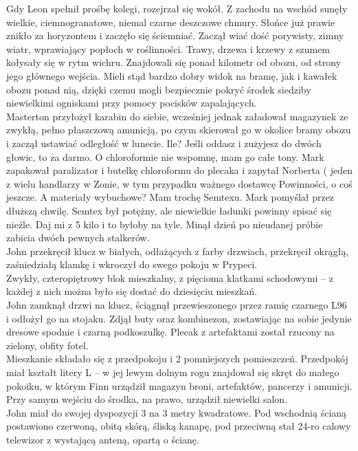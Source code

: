 \documentclass[../MAIN.tex]{subfiles}
\begin{document}
\qd
Gdy Leon spełnił prośbę kolegi, rozejrzał się wokół. Z zachodu na wschód sunęły wielkie, ciemnogranatowe, niemal czarne deszczowe chmury. Słońce już prawie znikło za horyzontem i zaczęło się ściemniać. Zaczął wiać dość porywisty, zimny wiatr, wprawiający popłoch w roślinności. Trawy, drzewa i krzewy z szumem kołysały się w rytm wichru. Znajdowali się ponad kilometr od obozu, od strony jego głównego wejścia. Mieli stąd bardzo dobry widok na bramę, jak i kawałek obozu ponad nią, dzięki czemu mogli bezpiecznie pokryć środek siedziby niewielkimi ogniskami przy pomocy pocisków zapalających. \\
Masterton przyłożył karabin do siebie, wcześniej jednak załadował magazynek ze zwykłą, pełno płaszczową amunicją, po czym skierował go w okolice bramy obozu i zaczął ustawiać odległość w lunecie.
%
\sx Ile?
\xx Jeśli oddasz i zużyjesz do dwóch głowic, to za darmo. O chloroformie nie wspomnę, mam go całe tony. \qd
Mark zapakował paralizator i butelkę chloroformu do plecaka i zapytał Norberta ( jeden z wielu handlarzy w Zonie, w tym przypadku ważnego dostawcę Powinności, o coś jeszcze.
\sx A materiały wybuchowe?
\xx Mam trochę Semtexu. \qd
Mark pomyślał przez dłuższą chwilę. Semtex był potężny, ale niewielkie ładunki powinny spisać się nieźle.
\sx Daj mi z 5 kilo i to byłoby na tyle. \qd
%
%
Minął dzień po nieudanej próbie zabicia dwóch pewnych stalkerów. \\
John przekręcił klucz w białych, odłażących z farby drzwiach, przekręcił okrągłą, zaśniedziałą klamkę i wkroczył do swego pokoju w Prypeci. \\
Zwykły, czteropiętrowy blok mieszkalny, z pięcioma klatkami schodowymi -- z każdej z nich można było się dostać do dziesięciu mieszkań. \\
John zamknął drzwi na klucz, ściągnął przewieszonego przez ramię czarnego L96 i odłożył go na stojaku. Zdjął buty oraz kombinezon, zostawiając na sobie jedynie dresowe spodnie i czarną podkoszulkę. Plecak z artefaktami został rzucony na zielony, obfity fotel. \\
Mieszkanie składało się z przedpokoju i 2 pomniejszych pomieszczeń. Przedpokój miał kształt litery L -- w jej lewym dolnym rogu znajdował się skręt do małego pokoiku, w którym Finn urządził magazyn broni, artefaktów, pancerzy i amunicji. Przy samym wejściu do środka, na prawo, urządził niewielki salon. \\
John miał do swojej dyspozycji 3 na 3 metry kwadratowe. Pod wschodnią ścianą postawiono czerwoną, obitą skórą, śliską kanapę, pod przeciwną stał 24-ro calowy telewizor z wystającą anteną, opartą o ścianę.
\end{document}
